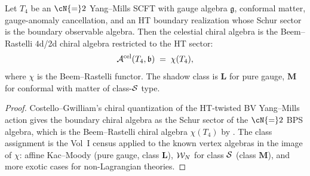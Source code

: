 \begin{proposition}
\label{prop:uch-ym}
Let $T_4$ be an $\cN{=}2$ Yang--Mills SCFT with gauge algebra
$\mathfrak g$, conformal matter, gauge-anomaly cancellation, and an
HT boundary realization whose Schur sector is the boundary observable
algebra. Then the celestial chiral algebra is the Beem--Rastelli
$4$d/2d chiral algebra
\cite{BeemRastelliChiralAlgebras4d,BLLRvR15} restricted to the HT
sector:
\[
\mathcal A^{\mathrm{cel}}(T_4,\mathfrak b) \;=\; \chi(T_4),
\]
where $\chi$ is the Beem--Rastelli functor. The shadow class is
$\mathbf L$ for pure gauge, $\mathbf M$ for conformal with matter of
class-$\mathcal S$ type.
\end{proposition}

\begin{proof}
Costello--Gwilliam's chiral quantization of the HT-twisted BV
Yang--Mills action gives the boundary chiral algebra as the Schur
sector of the $\cN{=}2$ BPS algebra, which is the Beem--Rastelli
chiral algebra $\chi(T_4)$ by
\cite[\S 4]{PaquetteWilliamsHT}. The class assignment is the Vol~I
census applied to the known vertex algebras in the image of $\chi$:
affine Kac--Moody (pure gauge, class $\mathbf L$), $\mathcal W_N$ for class
$\mathcal S$ (class $\mathbf M$), and more exotic cases for non-Lagrangian
theories.
\end{proof}

